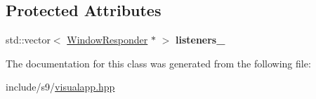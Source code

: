 \subsection*{Protected Attributes}
\begin{DoxyCompactItemize}
\item 
\hypertarget{classs9_1_1WindowApp_a33dc22fb9cd14198de0fcc8d3a93ed16}{std\-::vector$<$ \hyperlink{classs9_1_1WindowResponder}{Window\-Responder} $\ast$ $>$ {\bfseries listeners\-\_\-}}\label{classs9_1_1WindowApp_a33dc22fb9cd14198de0fcc8d3a93ed16}

\end{DoxyCompactItemize}


The documentation for this class was generated from the following file\-:\begin{DoxyCompactItemize}
\item 
include/s9/\hyperlink{visualapp_8hpp}{visualapp.\-hpp}\end{DoxyCompactItemize}
